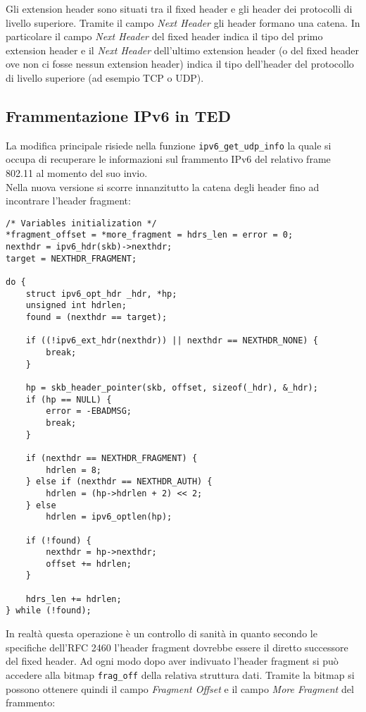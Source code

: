 \documentclass[a4paper,10pt]{article}
\begin{document}
Gli extension header sono situati tra il fixed header e gli header dei
protocolli di livello superiore. Tramite il campo \emph{Next Header} gli header
formano una catena. In particolare il campo \emph{Next Header} del fixed
header indica il tipo del primo extension header e il \emph{Next Header}
dell'ultimo extension header (o del fixed header ove non ci fosse nessun
extension header) indica il tipo dell'header del protocollo di livello
superiore (ad esempio TCP o UDP).

\subsection{Frammentazione IPv6 in TED}
La modifica principale risiede nella funzione
\texttt{ipv6\_get\_udp\_info} la quale si occupa di recuperare le
informazioni sul frammento IPv6 del relativo frame 802.11
 al momento del suo invio.\\

Nella nuova versione si scorre innanzitutto la catena degli header fino
ad incontrare l'header fragment:
\begin{lstlisting}
/* Variables initialization */
*fragment_offset = *more_fragment = hdrs_len = error = 0;
nexthdr = ipv6_hdr(skb)->nexthdr;
target = NEXTHDR_FRAGMENT;

do {
	struct ipv6_opt_hdr _hdr, *hp;
	unsigned int hdrlen;
	found = (nexthdr == target);

	if ((!ipv6_ext_hdr(nexthdr)) || nexthdr == NEXTHDR_NONE) {
		break;
	}

	hp = skb_header_pointer(skb, offset, sizeof(_hdr), &_hdr);
	if (hp == NULL) {
		error = -EBADMSG;
		break;
	}

	if (nexthdr == NEXTHDR_FRAGMENT) {
		hdrlen = 8;
	} else if (nexthdr == NEXTHDR_AUTH) {
		hdrlen = (hp->hdrlen + 2) << 2;
	} else
		hdrlen = ipv6_optlen(hp);

	if (!found) {
		nexthdr = hp->nexthdr;
		offset += hdrlen;
	}

	hdrs_len += hdrlen;
} while (!found);
\end{lstlisting}

In realtà questa operazione è un
controllo di sanità in quanto secondo le specifiche dell'RFC 2460\cite{rfc2460}
l'header fragment
dovrebbe essere il diretto successore del fixed header. 
Ad ogni modo dopo aver indivuato l'header fragment si può accedere alla
bitmap \texttt{frag\_off} della relativa struttura dati. Tramite la
bitmap si possono ottenere quindi il campo \emph{Fragment Offset} e il
campo \emph{More
Fragment} del frammento:
\end{document}
